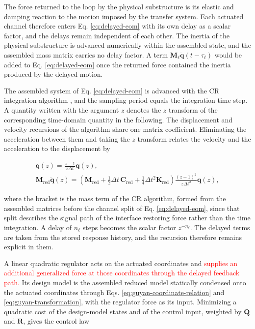 \documentclass[a4paper,fleqn,review,12pt]{cas-sc}
\numberwithin{equation}{section}
\newcommand{\rev}[1]{\textcolor{red}{#1}}
\begin{document}
The force returned to the loop by the physical substructure is its elastic and damping reaction to the motion imposed by the transfer system. Each actuated channel therefore enters Eq. \eqref{eq:delayed-eom} with its own delay as a scalar factor, and the delays remain independent of each other. The inertia of the physical substructure is advanced numerically within the assembled state, and the assembled mass matrix carries no delay factor. A term \(\mathbf{M}_{\ell}\ddot{\bm{q}}(t-\tau_{\ell})\) would be added to Eq. \eqref{eq:delayed-eom} once the returned force contained the inertia produced by the delayed motion.

The assembled system of Eq. \eqref{eq:delayed-eom} is advanced with the CR integration algorithm \rev{\cite{ChenCR2008}}, and the sampling period equals the integration time step. A quantity written with the argument \(z\) denotes the \(z\) transform of the corresponding time-domain quantity in the following. The displacement and velocity recursions of the algorithm share one matrix coefficient. Eliminating the acceleration between them and taking the \(z\) transform relates the velocity and the acceleration to the displacement by

\vspace{-3.5em}
\begin{equation}
	\begin{gathered}
		\dot{\bm{q}}(z)=\frac{z-1}{z\Delta t}\bm{q}(z),\\
		\mathbf{M}_{\mathrm{red}}\ddot{\bm{q}}(z)=
		\left(\mathbf{M}_{\mathrm{red}}
		+\tfrac{1}{2}\Delta t\,\mathbf{C}_{\mathrm{red}}
		+\tfrac{1}{4}\Delta t^{2}\mathbf{K}_{\mathrm{red}}\right)
		\frac{(z-1)^{2}}{z\Delta t^{2}}\bm{q}(z),
	\end{gathered}
	\label{eq:z-derivatives}
\end{equation}
\vspace{-3.0em}

\noindent where the bracket is the mass term of the CR algorithm, formed from the assembled matrices before the channel split of Eq. \eqref{eq:delayed-eom}, since that split describes the signal path of the interface restoring force rather than the time integration. A delay of \(n_{\ell}\) steps becomes the scalar factor \(z^{-n_{\ell}}\). The delayed terms are taken from the stored response history, and the recursion therefore remains explicit in them.

A linear quadratic regulator acts on the actuated coordinates and \rev{supplies an additional generalized force at those coordinates through the delayed feedback path.} Its design model is the assembled reduced model statically condensed onto the actuated coordinates through Eqs. \eqref{eq:guyan-coordinate-relation} and \eqref{eq:guyan-transformation}, with the regulator force as its input. Minimizing a quadratic cost of the design-model states and of the control input, weighted by \(\mathbf{Q}\) and \(\mathbf{R}\), gives the control law
\end{document}
